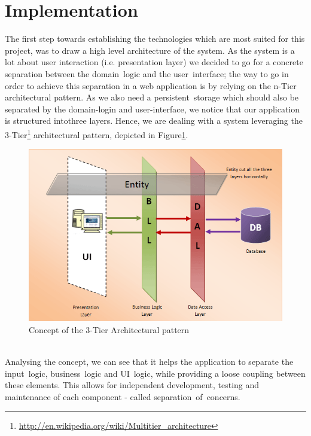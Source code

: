 \section{Implementation}
\label{sec.implementation}
\noindent The first step towards establishing the technologies which are most suited for this project, was to draw a high level architecture of the system. As the system is a lot about user interaction (i.e. presentation layer) we decided to go for a concrete separation between the domain~logic and the user~interface; the way to go in order to achieve this separation in a web application is by relying on the n-Tier architectural pattern. As we also need a persistent~storage which should also be separated by the domain-login and user-interface, we notice that our application is structured intothree layers. Hence, we are dealing with a system leveraging the 3-Tier\footnote{\url{http://en.wikipedia.org/wiki/Multitier_architecture}} architectural pattern, depicted in Figure\ref{fig.setup}.
\begin{figure}[H] 
	\centering
	\includegraphics[width=\linewidth]{fig/3tier2}
	\caption{Concept of the 3-Tier Architectural pattern}
	\label{fig.setup}
\end{figure}
\\

\noindent Analysing the concept, we can see that it helps the application to separate the input~logic, business~logic and UI~logic, while providing a loose coupling between these elements. This allows for independent development, testing and maintenance of each component - called separation~of~concerns.
\\

